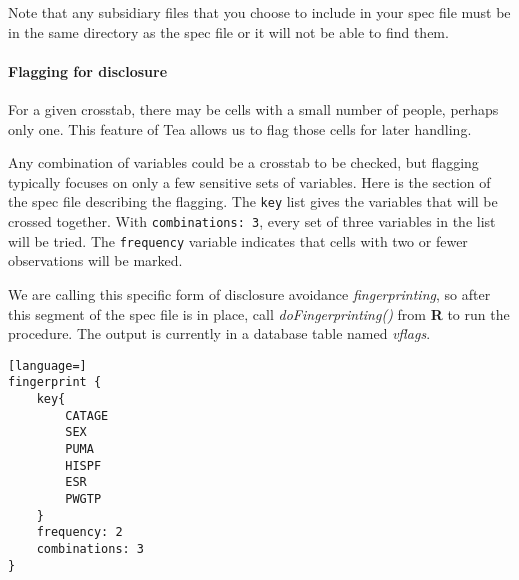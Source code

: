 \documentclass{article}
\begin{document}
Note that any subsidiary files that you choose to include in your spec file must be in the same 
directory as the spec file or it will not be able to find them.

\paragraph{Flagging for disclosure} For a given crosstab, there may be cells with a small number of 
people, perhaps only one. This feature of Tea allows us to flag those cells for later handling.

Any combination of variables could be a crosstab to be checked, but flagging
typically focuses on only a few sensitive sets of variables. Here is the section
of the spec file describing the flagging. The {\tt key} list gives the variables
that will be crossed together. With {\tt combinations: 3}, every set of three
variables in the list will be tried. The {\tt frequency} variable indicates that
cells with two or fewer observations will be marked.

We are calling this specific form of disclosure avoidance {\em fingerprinting}, so after
this segment of the spec file is in place, call {\em doFingerprinting()} from \textbf{R} to run the
procedure. The output is currently in a database table named {\em vflags}.

\begin{lstlisting}[language=]
fingerprint {
    key{
        CATAGE
        SEX
        PUMA
        HISPF
        ESR
        PWGTP
    }
    frequency: 2
    combinations: 3
}
\end{lstlisting}
\end{document}
